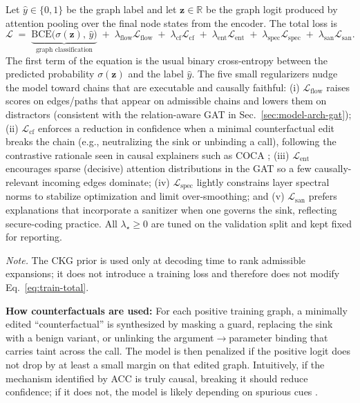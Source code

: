 \documentclass{buthesis}
\begin{document}
Let $\hat{y}\!\in\!\{0,1\}$ be the graph label and let $\mathbf{z}\!\in\!\mathbb{R}$ be the graph logit produced by attention pooling over the final node states from the encoder. The total loss is
\begin{equation}
\label{eq:train-total}
\mathcal{L}\;=\;\underbrace{\mathrm{BCE}\!\big(\sigma(\mathbf{z}),\,\hat{y}\big)}_{\text{graph classification}}
\;+\;\lambda_{\text{flow}}\mathcal{L}_{\text{flow}}
\;+\;\lambda_{\text{cf}}\mathcal{L}_{\text{cf}}
\;+\;\lambda_{\text{ent}}\mathcal{L}_{\text{ent}}
\;+\;\lambda_{\text{spec}}\mathcal{L}_{\text{spec}}
\;+\;\lambda_{\text{san}}\mathcal{L}_{\text{san}}.
\end{equation}
The first term of the equation is the usual binary cross-entropy between the predicted probability $\sigma(\mathbf{z})$ and the label $\hat{y}$. The five small regularizers nudge the model toward chains that are executable and causally faithful: (i) $\mathcal{L}_{\text{flow}}$ raises scores on edges/paths that appear on admissible chains and lowers them on distractors (consistent with the relation-aware GAT in Sec.~\ref{sec:model-arch-gat}); (ii) $\mathcal{L}_{\text{cf}}$ enforces a reduction in confidence when a minimal counterfactual edit breaks the chain (e.g., neutralizing the sink or unbinding a call), following the contrastive rationale seen in causal explainers such as COCA \cite{Cao2024ICSE}; (iii) $\mathcal{L}_{\text{ent}}$ encourages sparse (decisive) attention distributions in the GAT so a few causally-relevant incoming edges dominate; (iv) $\mathcal{L}_{\text{spec}}$ lightly constrains layer spectral norms to stabilize optimization and limit over-smoothing; and (v) $\mathcal{L}_{\text{san}}$ prefers explanations that incorporate a sanitizer when one governs the sink, reflecting secure-coding practice. All $\lambda_{\star}\!\ge\!0$ are tuned on the validation split and kept fixed for reporting.

\noindent\emph{Note.} The CKG prior is used only at decoding time to rank admissible expansions; it does not introduce a training loss and therefore does not modify Eq.~\eqref{eq:train-total}.

\textbf{How counterfactuals are used:}
For each positive training graph, a minimally edited ``counterfactual'' is synthesized by masking a guard, replacing the sink with a benign variant, or unlinking the argument$\!\rightarrow\!$parameter binding that carries taint across the call. The model is then penalized if the positive logit does not drop by at least a small margin on that edited graph. Intuitively, if the mechanism identified by ACC is truly causal, breaking it should reduce confidence; if it does not, the model is likely depending on spurious cues \cite{Cao2024ICSE}.
\end{document}
